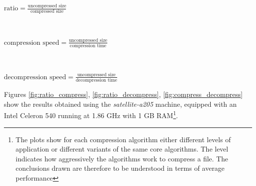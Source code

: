 \documentclass[10pt, a4paper]{report}
\begin{document}
\begin{itemize}
	\begin{minipage}{0.92\textwidth}
		\item
		$\text{ratio} = \frac{\text{uncompressed size}}{\text{compressed size}}$ \\
	\end{minipage} \\
	\begin{minipage}{0.92\textwidth}
		\item
		$\text{compression speed} = \frac{\text{uncompressed size}}{\text{compression time}}$ \\
	\end{minipage} \\
	\begin{minipage}{0.92\textwidth}
		\item
		$\text{decompression speed} = \frac{\text{uncompressed size}}{\text{decompression time}}$ \\
	\end{minipage}
\end{itemize}

Figures \ref{fig:ratio_compress}, \ref{fig:ratio_decompress}, \ref{fig:compress_decompress} show the results obtained using the \textit{satellite-a205} machine, equipped with an Intel Celeron 540 running at 1.86 GHz with 1 GB RAM\footnote{The plots show for each compression algorithm either different levels of application or different variants of the same core algorithms. The level indicates how aggressively the algorithms work to compress a file. The conclusions drawn are therefore to be understood in terms of average performance}.
\end{document}
